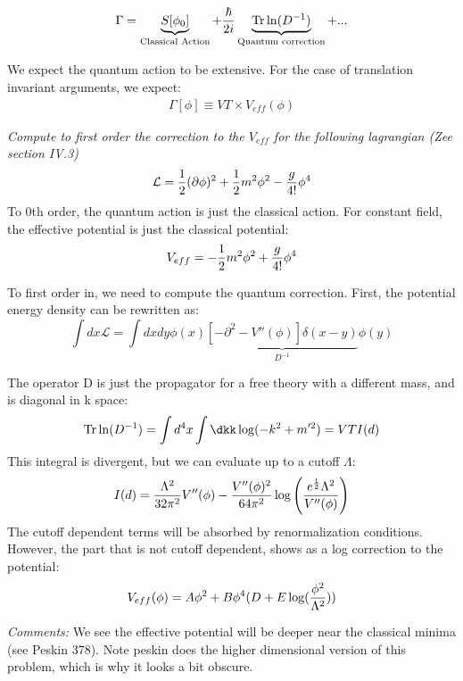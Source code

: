 \documentclass[9pt]{scrartcl}
\begin{document}
\begin{align}
\Gamma = \underbrace{S[\phi_0]}_{\text{Classical Action}} + { \hbar \over 2 i} \underbrace{\text{Tr} \ln(D^{-1})}_{\text{Quantum correction}} + ...
\end{align}

We expect the quantum action to be extensive.  For the case of translation invariant arguments, we expect:
\begin{align}
\Gamma[\phi] \equiv VT \times V_{eff}(\phi)
\end{align}

\begin{example}
\emph{Compute to first order the correction to the $V_{eff}$ for the following lagrangian (Zee section IV.3)}
$$ \mathcal{L} = \frac12 (\partial \phi)^2 + \frac12 m^2 \phi^2 - {g \over 4!} \phi^4$$
To 0th order, the quantum action is just the classical action.  For constant field, the effective potential is just the classical potential:
$$V_{eff} =  -\frac12 m^2 \phi^2 + {g \over 4!} \phi^4$$

To first order in, we need to compute the quantum correction.  First, the potential energy density can be rewritten as:
$$ \int dx \mathcal{L} = \int dx dy \phi(x) \underbrace{[-\partial^2 - V''(\phi)] \delta(x-y)}_{D^{-1}} \phi(y)$$ 

The operator D is just the propagator for a free theory with a different mass, and is diagonal in k space:
\begin{align}
\text{Tr} \ln(D^{-1}) = \int d^4 x \int \dkk \log({-k^2 + m'^2})  
= V T I(d) 
\end{align}
This integral is divergent, but we can evaluate up to a cutoff $\Lambda$:
\begin{align}
I(d) = {\Lambda^2 \over 32 \pi^2} V''(\phi) - {V''(\phi)^2 \over 64 \pi^2} \log \left({e^{\frac12} \Lambda^2 \over V''(\phi)} \right)
\end{align}
The cutoff dependent terms will be absorbed by renormalization conditions.  However, the part that is not cutoff dependent, shows
as a log correction to the potential:
\begin{align}
V_{eff} (\phi) = A \phi^2 + B \phi^4 (D + E \log({\phi^2 \over \Lambda^2}))
\end{align}
\end{example}
\emph{Comments:}
We see the effective potential will be deeper near the classical minima (see Peskin 378).  Note peskin does the higher dimensional
version of this problem, which is why it looks a bit obscure.  
\end{document}
